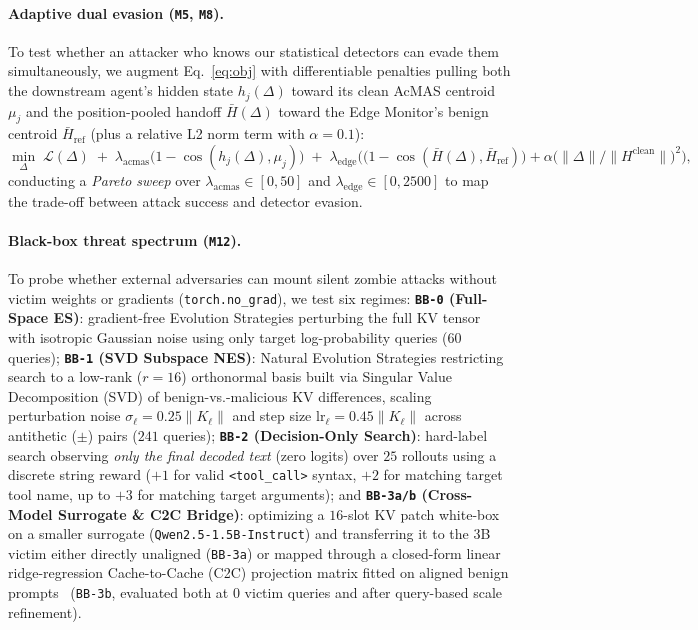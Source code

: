 \documentclass{article}
\begin{document}
\paragraph{Adaptive dual evasion (\texttt{M5}, \texttt{M8}).}
To test whether an attacker who knows our statistical detectors can evade them
simultaneously, we augment Eq.~\eqref{eq:obj} with differentiable penalties
pulling both the downstream agent's hidden state $h_j(\Delta)$ toward its clean
AcMAS centroid $\mu_j$ and the position-pooled handoff $\bar H(\Delta)$ toward
the Edge Monitor's benign centroid $\bar H_{\mathrm{ref}}$ (plus a relative L2
norm term with $\alpha=0.1$):
\begin{equation}
\label{eq:dualstealth}
\min_{\Delta}\; \mathcal L(\Delta)
\;+\; \lambda_{\mathrm{acmas}}\big(1-\cos(h_j(\Delta),\mu_j)\big)
\;+\; \lambda_{\mathrm{edge}}\Big(\big(1-\cos(\bar H(\Delta),\bar H_{\mathrm{ref}})\big) + \alpha\big(\|\Delta\|/\|H^{\mathrm{clean}}\|\big)^2\Big),
\end{equation}
conducting a \emph{Pareto sweep} over $\lambda_{\mathrm{acmas}}\in[0,50]$ and
$\lambda_{\mathrm{edge}}\in[0,2500]$ to map the trade-off between attack
success and detector evasion.

\paragraph{Black-box threat spectrum (\texttt{M12}).}
To probe whether external adversaries can mount silent zombie attacks without
victim weights or gradients (\texttt{torch.no\_grad}), we test six regimes:
\textbf{\texttt{BB-0} (Full-Space ES)}: gradient-free Evolution Strategies
perturbing the full KV tensor with isotropic Gaussian noise using only target
log-probability queries ($60$ queries);
\textbf{\texttt{BB-1} (SVD Subspace NES)}: Natural Evolution Strategies
restricting search to a low-rank ($r=16$) orthonormal basis built via Singular
Value Decomposition (SVD) of benign-vs.-malicious KV differences, scaling
perturbation noise $\sigma_\ell=0.25\|K_\ell\|$ and step size
$\text{lr}_\ell=0.45\|K_\ell\|$ across antithetic ($\pm$) pairs ($241$
queries);
\textbf{\texttt{BB-2} (Decision-Only Search)}: hard-label search observing
\emph{only the final decoded text} (zero logits) over $25$ rollouts using a
discrete string reward ($+1$ for valid \texttt{<tool\_call>} syntax, $+2$ for
matching target tool name, up to $+3$ for matching target arguments); and
\textbf{\texttt{BB-3a/b} (Cross-Model Surrogate \& C2C Bridge)}: optimizing a
$16$-slot KV patch white-box on a smaller surrogate
(\texttt{Qwen2.5-1.5B-Instruct}) and transferring it to the $3$B victim either
directly unaligned (\texttt{BB-3a}) or mapped through a closed-form linear
ridge-regression Cache-to-Cache (C2C) projection matrix fitted on aligned
benign prompts~\citep{c2c} (\texttt{BB-3b}, evaluated both at $0$ victim
queries and after query-based scale refinement).
\end{document}
